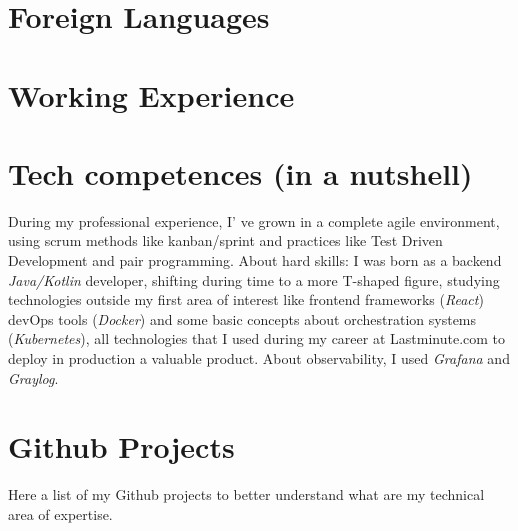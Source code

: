 \documentclass[letterpaper]{twentysecondcv} %
\begin{document}
\section{Foreign Languages}

\begin{twenty}
\end{twenty}


\section{Working Experience}

\begin{twenty}
\end{twenty}

\section{Tech competences (in a nutshell)}

During my professional experience, I' ve grown in a complete agile environment, using scrum methods like kanban/sprint and practices like Test Driven Development and pair programming. \newline 
About hard skills: I was born as a backend \emph{Java/Kotlin} developer, shifting during time to a more T-shaped figure, studying technologies outside my first area of interest like frontend frameworks (\emph{React}) devOps tools (\emph{Docker}) and some basic concepts about orchestration systems (\emph{Kubernetes}), all technologies that I used during my career at Lastminute.com to deploy in production a valuable product.\newline
About observability, I used \emph{Grafana} and \emph{Graylog}.\newline

\section{Github Projects}
\newline\newline
Here a list of my Github projects to better understand what are my technical area of expertise.
\end{document}
